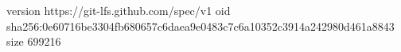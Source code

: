 version https://git-lfs.github.com/spec/v1
oid sha256:0e60716be3304fb680657c6daea9e0483c7c6a10352c3914a242980d461a8843
size 699216
